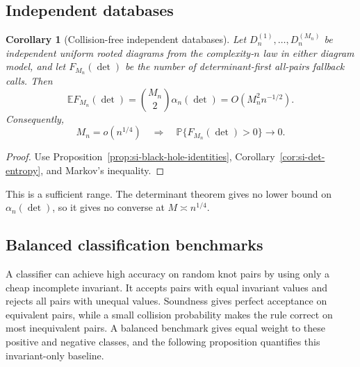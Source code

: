 \documentclass[9pt,twoside]{pnas-new}
\newtheorem{corollary}[theorem]{Corollary}
\theoremstyle{definition}
\theoremstyle{remark}
\renewcommand{\Pr}{\mathbb{P}}
\begin{document}
\subsection{Independent databases}
\begin{corollary}[Collision-free independent databases]
\label{cor:si-no-fallback}
Let $D_n^{(1)},\ldots,D_n^{(M_n)}$ be independent uniform rooted diagrams from the complexity-$n$ law in either diagram model, and let $F_{M_n}(\det)$ be the number of determinant-first all-pairs fallback calls. Then
\[
 \mathbb EF_{M_n}(\det)
 =\binom{M_n}{2}\alpha_n(\det)
 =O(M_n^2n^{-1/2}).
\]
Consequently,
\[
 M_n=o(n^{1/4})
 \quad\Longrightarrow\quad
 \Pr\{F_{M_n}(\det)>0\}\longrightarrow0.
\]
\end{corollary}

\begin{proof}
Use Proposition~\ref{prop:si-black-hole-identities}, Corollary~\ref{cor:si-det-entropy}, and Markov's inequality.
\end{proof}

This is a sufficient range.  The determinant theorem gives no lower bound on $\alpha_n(\det)$, so it gives no converse at $M\asymp n^{1/4}$.

\subsection{Balanced classification benchmarks}
A classifier can achieve high accuracy on random knot pairs by using only a cheap incomplete invariant. It accepts pairs with equal invariant values and rejects all pairs with unequal values. Soundness gives perfect acceptance on equivalent pairs, while a small collision probability makes the rule correct on most inequivalent pairs. A balanced benchmark gives equal weight to these positive and negative classes, and the following proposition quantifies this invariant-only baseline.
\end{document}
